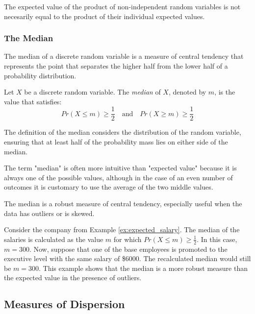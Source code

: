 The expected value of the product of non-independent random variables is not necesarily equal to the product of their individual expected values.


\subsubsection*{The Median}

The median of a discrete random variable is a measure of central tendency that represents the point that separates the higher half from the lower half of a probability distribution.

\begin{definition}
Let $X$ be a discrete random variable. The \emph{median} of $X$, denoted by $m$, is the value that satisfies:
\[
Pr\left(X\leq m\right)\geq \frac{1}{2} \quad \text{and} \quad Pr\left(X\geq m\right)\geq \frac{1}{2}
\]
\end{definition}

The definition of the median considers the distribution of the random variable, ensuring that at least half of the probability mass lies on either side of the median.

The term "median" is often more intuitive than "expected value" because it is always one of the possible values, although in the case of an even number of outcomes it is customary to use the average of the two middle values.

The median is a robust measure of central tendency, especially useful when the data has outliers or is skewed.

\begin{example}
Consider the company from Example \ref{ex:expected_salary}. The median of the salaries is calculated as the value $m$ for which $Pr\left(X\leq m\right)\geq \frac{1}{2}$. In this case, $m=300$. Now, suppose that one of the base employees is promoted to the executive level with the same salary of \$6000. The recalculated median would still be $m=300$. This example shows that the median is a more robust measure than the expected value in the presence of outliers.
\end{example}


%
%

\subsection{Measures of Dispersion}


